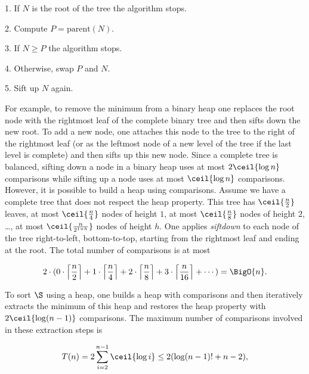\begin{algorithm}
\item[1.] If \(N\) is the root of the tree the algorithm stops.
\item[2.] Compute \(P = \text{parent}(N)\).
\item[3.] If \(N \ge P\) the algorithm stops.
\item[4.] Otherwise, swap \(P\) and \(N\).
\item[5.] Sift up \(N\) again.
\end{algorithm}

For example, to remove the minimum from a binary heap one replaces the root
node with the rightmost leaf of the complete binary tree and then sifts down
the new root. To add a new node, one attaches this node to the tree to the
right of the rightmost leaf (or as the leftmost node of a new level
of the tree if the last level is complete) and then sifts up this new node.
Since a complete tree is balanced, sifting down a node in a binary heap uses
at most \(2 \ceil{\log n}\) comparisons while sifting up a node uses at most
\(\ceil{\log n}\)
comparisons. However, it is possible to build a heap using 
comparisons. Assume we have a complete tree that does not respect the heap
property. This tree has \(\ceil{\frac{n}{2}}\) leaves, at most
\(\ceil{\frac{n}{4}}\) nodes of height \(1\), at most \(\ceil{\frac{n}{8}}\)
nodes of height \(2\), \dots, \ie at most \(\ceil{\frac{n}{2^{1+h}}}\) nodes
of height \(h\).
One applies \emph{siftdown} to each node of the tree right-to-left,
bottom-to-top, starting from the rightmost leaf and ending at the root. The
total number of comparisons is at most

\begin{displaymath}
2 \cdot ( 0 \cdot \left\lceil\frac{n}{2}\right\rceil + 1 \cdot
\left\lceil\frac{n}{4}\right\rceil + 2 \cdot
\left\lceil\frac{n}{8}\right\rceil + 3 \cdot \left\lceil\frac{n}{16}\right\rceil + \cdots ) = \BigO{n}.
\end{displaymath}

To sort \(\S\) using a heap, one builds a heap with  comparisons and
then iteratively extracts the minimum of this heap and restores the heap
property with \(2\ceil{\log (n-1)}\) comparisons. The maximum number of
comparisons involved in these extraction steps is

\begin{displaymath}
T(n) = 2 \sum_{i=2}^{n-1} \ceil{\log i} \le 2 ( \log (n-1)! + n - 2 ),
\end{displaymath}

